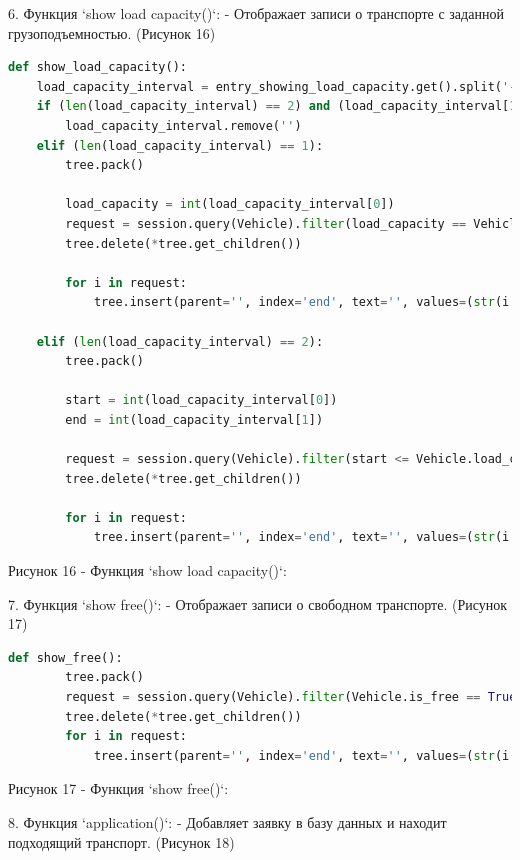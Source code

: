 \documentclass[14pt]{extreport}
\begin{document}
6. Функция `show load capacity()`:
   - Отображает записи о транспорте с заданной грузоподъемностью. (Рисунок 16)
   \begin{lstlisting}[language=Python]
def show_load_capacity():
    load_capacity_interval = entry_showing_load_capacity.get().split('-')
    if (len(load_capacity_interval) == 2) and (load_capacity_interval[1] == ''):
        load_capacity_interval.remove('')
    elif (len(load_capacity_interval) == 1):
        tree.pack()

        load_capacity = int(load_capacity_interval[0])
        request = session.query(Vehicle).filter(load_capacity == Vehicle.load_capacity)
        tree.delete(*tree.get_children())

        for i in request:
            tree.insert(parent='', index='end', text='', values=(str(i.id), i.type, str(i.load_capacity), i.length, i.width, i.height))

    elif (len(load_capacity_interval) == 2):
        tree.pack()

        start = int(load_capacity_interval[0])
        end = int(load_capacity_interval[1])

        request = session.query(Vehicle).filter(start <= Vehicle.load_capacity).filter(Vehicle.load_capacity <= end)
        tree.delete(*tree.get_children())

        for i in request:
            tree.insert(parent='', index='end', text='', values=(str(i.id), i.type, str(i.load_capacity), i.length, i.width, i.height))

   \end{lstlisting}
   \begin{center}
    Рисунок 16 - Функция `show load capacity()`:
\end{center}
7. Функция `show free()`:
   - Отображает записи о свободном транспорте. (Рисунок 17)
   \begin{lstlisting}[language=Python]
    def show_free():
        tree.pack()
        request = session.query(Vehicle).filter(Vehicle.is_free == True)
        tree.delete(*tree.get_children())
        for i in request:
            tree.insert(parent='', index='end', text='', values=(str(i.id), i.type, str(i.load_capacity), i.length, i.width, i.height))
   \end{lstlisting}
   \begin{center}
    Рисунок 17 - Функция `show free()`:
\end{center}
8. Функция `application()`:
    - Добавляет заявку в базу данных и находит подходящий транспорт. (Рисунок 18)
\end{document}
